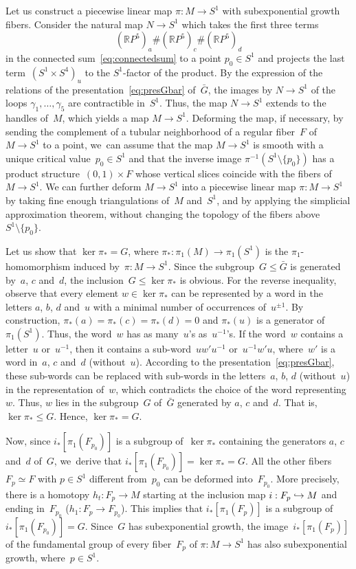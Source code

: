 \documentclass[10pt]{amsart}
\newcommand\hto{\mathrel{\lhook\joinrel\to}}
\theoremstyle{definition}
\newcommand\R{{\mathbb R}}
\begin{document}
Let us construct a piecewise linear map $\pi:M \to S^1$ with subexponential growth fibers.
Consider the natural map $N \to S^1$ which takes the first three terms
\[
(\R P^5)_a \# (\R P^5)_c \# (\R P^5)_d
\]
in the connected sum~\eqref{eq:connectedsum} to a point $p_0 \in S^1$ and projects the last term~$(S^1 \times S^4)_u$ to the $S^1$-factor of the product.
By the expression of the relations of the presentation~\eqref{eq:presGbar} of~$\bar{G}$, the images by $N \to S^1$ of the loops $\gamma_1,\dots,\gamma_5$ are contractible in~$S^1$.
Thus, the map $N \to S^1$ extends to the handles of~$M$, which yields a map $M \to S^1$.
Deforming the map, if necessary, by sending the complement of a tubular neighborhood of a regular fiber~$F$ of~$M \to S^1$ to a point, we~can assume that the map $M \to S^1$ is smooth with a unique critical value~$p_0 \in S^1$ and that the inverse image $\pi^{-1}(S^1 \setminus \{p_0\})$ has a product structure~$(0,1) \times F$ whose vertical slices coincide with the fibers of~$M \to S^1$.
We can further deform $M \to S^1$ into a piecewise linear map $\pi:M \to S^1$ by taking fine enough triangulations of~$M$ and~$S^1$, and by applying the simplicial approximation theorem, without changing the topology of the fibers above~$S^1 \setminus \{p_0\}$.

Let us show that $\ker \pi_* = G$, where $\pi_*:\pi_1(M) \to \pi_1(S^1)$ is the $\pi_1$-homomorphism induced by~$\pi:M \to S^1$.
Since the subgroup~$G \leqslant \bar{G}$ is generated by~$a$, $c$ and~$d$, the inclusion~$G \leqslant \ker \pi_*$ is obvious.
For the reverse inequality, observe that every element $w \in \ker \pi_*$ can be represented by a word in the letters $a$, $b$, $d$ and~$u$ with a minimal number of occurrences of~$u^{\pm 1}$.
By construction, $\pi_*(a) = \pi_*(c) = \pi_*(d) = 0$ and $\pi_*(u)$ is a generator of~$\pi_1(S^1)$.
Thus, the word~$w$ has as many~$u$'s as~$u^{-1}$'s.
If the word~$w$ contains a letter~$u$ or~$u^{-1}$, then it contains a sub-word~$uw'u^{-1}$ or~$u^{-1}w'u$, where~$w'$ is a word in~$a$, $c$ and~$d$ (without~$u$).
According to the presentation~\eqref{eq:presGbar}, these sub-words can be replaced with sub-words in the letters~$a$, $b$, $d$ (without~$u$) in the representation of~$w$, which contradicts the choice of the word representing~$w$.
Thus, $w$ lies in the subgroup~$G$ of~$\bar{G}$ generated by $a$, $c$ and~$d$.
That is, $\ker \pi_* \leqslant G$.
Hence, $\ker \pi_* =G$.

Now, since $i_*[\pi_1(F_{p_0})]$ is a subgroup of~$\ker \pi_*$ containing the generators $a$, $c$ and~$d$ of~$G$, we~derive that $i_*[\pi_1(F_{p_0})] = \ker \pi_* = G$.
All the other fibers~$F_p \simeq F$ with $p \in S^1$ different from~$p_0$ can be deformed into~$F_{p_0}$.
More precisely, there is a homotopy $h_t:F_p \to M$ starting at the inclusion map $i:F_p \hto M$ and ending in~$F_{p_0}$ \hbox{(\ie $h_1:F_p \to F_{p_0}$)}.
This implies that $i_*[\pi_1(F_p)]$ is a subgroup of~$i_*[\pi_1(F_{p_0})] = G$.
Since~$G$ has subexponential growth, the image~$i_*[\pi_1(F_p)]$ of the fundamental group of every fiber~$F_p$ of $\pi:M \to S^1$ has also subexponential growth, where~$p \in S^1$.
\end{document}
